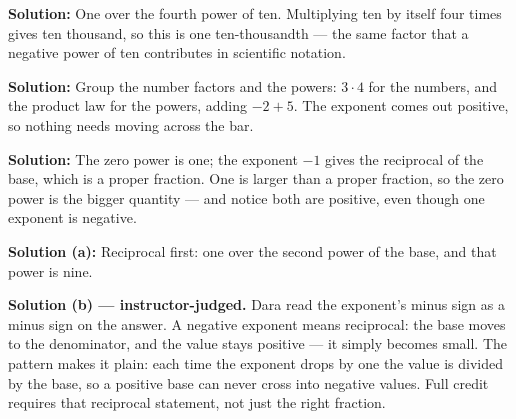 \documentclass[12pt]{article}
\begin{document}
\textbf{Solution:} \quad One over the fourth power of ten. Multiplying ten by itself four
times gives ten thousand, so this is one ten-thousandth --- the same factor that a negative
power of ten contributes in scientific notation. 


\textbf{Solution:} \quad Group the number factors and the powers: $3 \cdot 4$ for the
numbers, and the product law for the powers, adding $-2 + 5$. The exponent comes out
positive, so nothing needs moving across the bar. 


\textbf{Solution:} \quad The zero power is one; the exponent $-1$ gives the reciprocal of
the base, which is a proper fraction. One is larger than a proper fraction, so the zero
power is the bigger quantity --- and notice both are positive, even though one exponent is
negative. \ans{>}


\textbf{Solution (a):} \quad Reciprocal first: one over the second power of the base, and
that power is nine. 

\textbf{Solution (b) --- instructor-judged.} \quad Dara read the exponent's minus sign as a
minus sign on the answer. A negative exponent means reciprocal: the base moves to the
denominator, and the value stays positive --- it simply becomes small. The pattern makes it
plain: each time the exponent drops by one the value is divided by the base, so a positive
base can never cross into negative values. Full credit requires that reciprocal statement,
not just the right fraction.
\end{document}
